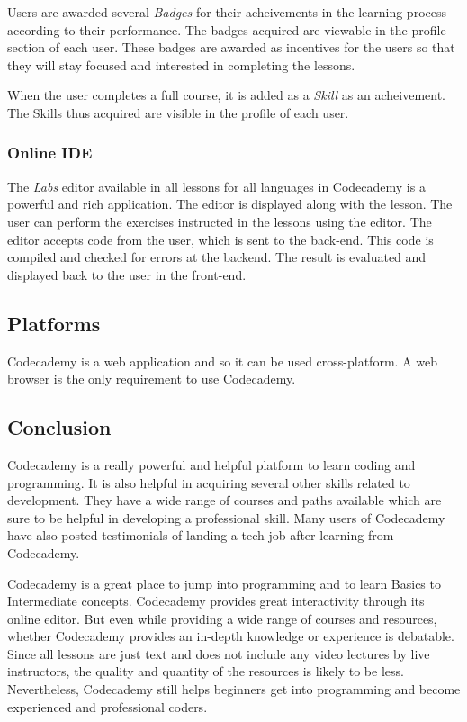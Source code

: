 Users are awarded several {\em Badges} for their acheivements in the learning process according to their performance. The badges acquired are viewable in the profile section of each user. These badges are awarded as incentives for the users so that they will stay focused and interested in completing the lessons.

When the user completes a full course, it is added as a {\em Skill} as an acheivement. The Skills thus acquired are visible in the profile of each user.

\subsubsection {Online IDE}
The {\em Labs} editor available in all lessons for all languages in Codecademy is a powerful and rich application. The editor is displayed along with the lesson. The user can perform the exercises instructed in the lessons using the editor. The editor accepts code from the user, which is sent to the back-end. This code is compiled and checked for errors at the backend. The result is evaluated and displayed back to the user in the front-end.

\subsection{Platforms}
Codecademy is a web application and so it can be used cross-platform. A web browser is the only requirement to use Codecademy.

\subsection{Conclusion}
Codecademy is a really powerful and helpful platform to learn coding and programming. It is also helpful in acquiring several other skills related to development. They have a wide range of courses and paths available which are sure to be helpful in developing a professional skill. Many users of Codecademy have also posted testimonials of landing a tech job after learning from Codecademy.

Codecademy is a great place to jump into programming and to learn Basics to Intermediate concepts. Codecademy provides great interactivity through its online editor. But even while providing a wide range of courses and resources, whether Codecademy provides an in-depth knowledge or experience is debatable. Since all lessons are just text and does not include any video lectures by live instructors, the quality and quantity of the resources is likely to be less. Nevertheless, Codecademy still helps beginners get into programming and become experienced and professional coders. 

